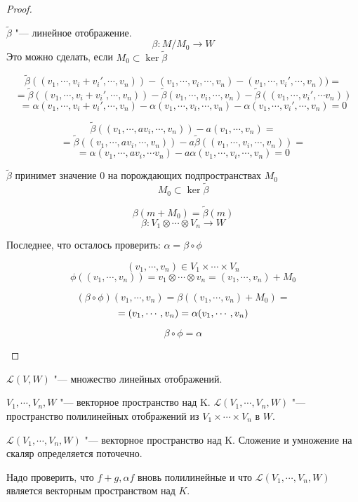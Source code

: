 \begin{description}
\begin{proof}
\begin{enumerate}
         $\tilde{\beta}$ "--- линейное отображение. 
         $$\beta\colon M/M_0 \to W$$
         Это можно сделать, если $M_0 \subset \ker \tilde{\beta}$

         $$\tilde{\beta}((v_1, \cdots, v_i + v_i', \cdots, v_n)) - (v_1, \cdots, v_i, \cdots, v_n) - (v_1, \cdots, v_i', \cdots, v_n)) =$$
         $$= \tilde{\beta}((v_1, \cdots, v_i + v_i', \cdots, v_n)) - \tilde{\beta}(v_1, \cdots, v_i, \cdots, v_n) - 
         \tilde{\beta}((v_1, \cdots,v_i', \cdots v_n))$$
         $$= \alpha(v_1, \cdots, v_i + v_i', \cdots, v_n) - \alpha(v_1, \cdots, v_i, \cdots, v_n) - \alpha(v_1, \cdots,v_i', \cdots,  v_n) = 0$$

         $$\tilde{\beta}((v_1, \cdots, a v_i,\cdots, v_n)) - a(v_1, \cdots, v_n) = $$
         $$= \tilde{\beta}((v_1, \cdots, a v_i, \cdots, v_n)) - a \tilde{\beta}((v_1, \cdots, v_i,\cdots, v_n)) = $$
         $$= \alpha(v_1, \cdots, a v_i, \cdots v_n) - a\alpha(v_1, \cdots, v_i, \cdots, v_n) = 0$$

         $\tilde{\beta}$ принимет значение 0 на порождающих подпространствах $M_0$
         $$M_0 \subset \ker \tilde{\beta}$$

         $$\beta(m + M_0) = \tilde{\beta}(m)$$
         $$\beta \colon V_1 \otimes \cdots \otimes V_n \to W$$

         Последнее, что осталось проверить: $\alpha = \beta \circ \phi$

         $$(v_1, \cdots, v_n) \in V_1 \times \cdots \times V_n$$
         $$\phi((v_1, \cdots, v_n)) = v_1 \otimes \cdots \otimes v_n = (v_1, \cdots, v_n) + M_0$$

         $$(\beta \circ \phi)(v_1, \cdots, v_n) = \beta((v_1, \cdots, v_n) + M_0) = $$
         $$= \title{\beta}(v_1, \cdots, v_n) = \alpha(v_1, \cdots, v_n)$$

         $$\beta \circ \phi = \alpha$$
    \end{enumerate}
    \end{proof}
        $\mathcal{L}(V, W)$  "--- множество линейных отображений. 
       
        $V_1, \cdots, V_n, W$   "--- векторное пространство над K.
        $\mathcal{L}(V_1, \cdots, V_n, W)$ "--- пространство полилинейных отображений из
        $V_1 \times \cdots \times V_n$ в $W$.  
        
        $\mathcal{L}(V_1, \cdots, V_n, W)$ "--- векторное пространство над K.
        Сложение и умножение на скаляр определяется поточечно. 
       
        Надо проверить, что $f+g, \alpha f$ вновь полилинейные и 
        что $\mathcal{L}(V_1, \cdots, V_n, W)$ является векторным пространством над $K$.


\end{description}
